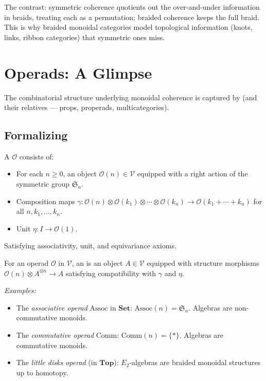 \begin{remark}
The contrast: symmetric coherence quotients out the over-and-under information
in braids, treating each as a permutation; braided coherence keeps the full
braid. This is why braided monoidal categories model topological information
(knots, links, ribbon categories) that symmetric ones miss.
\end{remark}


\section{Operads: A Glimpse}
\label{sec:operads}

The combinatorial structure underlying monoidal coherence is captured by
 (and their relatives — props, properads, multicategories).

\subsection{Formalizing}

\begin{definition}[Operad]
\label{def:operad}
A  $\mathcal{O}$ consists of:
\begin{itemize}
  \item For each $n \geq 0$, an object $\mathcal{O}(n) \in \mathcal{V}$
        equipped with a right action of the symmetric group $\mathfrak{S}_n$.
  \item Composition maps $\gamma : \mathcal{O}(n) \otimes \mathcal{O}(k_1)
        \otimes \cdots \otimes \mathcal{O}(k_n) \to \mathcal{O}(k_1 + \cdots
        + k_n)$ for all $n, k_1, \ldots, k_n$.
  \item Unit $\eta : I \to \mathcal{O}(1)$.
\end{itemize}
Satisfying associativity, unit, and equivariance axioms.
\end{definition}

\begin{remark}
For an operad $\mathcal{O}$ in $\mathcal{V}$, an 
is an object $A \in \mathcal{V}$ equipped with structure morphisms
$\mathcal{O}(n) \otimes A^{\otimes n} \to A$ satisfying compatibility with
$\gamma$ and $\eta$.

\emph{Examples:}
\begin{itemize}
  \item The \emph{associative operad} $\mathrm{Assoc}$ in $\mathbf{Set}$:
        $\mathrm{Assoc}(n) = \mathfrak{S}_n$. Algebras are non-commutative monoids.
  \item The \emph{commutative operad} $\mathrm{Comm}$: $\mathrm{Comm}(n) =
        \{*\}$. Algebras are commutative monoids.
  \item The \emph{little disks operad} (in $\mathbf{Top}$): $E_2$-algebras
        are braided monoidal structures up to homotopy.
\end{itemize}
\end{remark}

